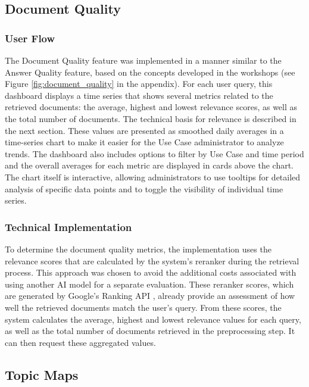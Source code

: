 \documentclass[
	english,
	ruledheaders=section,%
	class=report,%
	thesis={type=bachelor},%
	accentcolor=1b,%
	custommargins=true,%
	marginpar=false,%
	parskip=half-,%
	fontsize=11pt,%
	DIV=14,
]{tudapub}
\begin{document}
\subsection{Document Quality}
\subsubsection{User Flow}
The Document Quality feature was implemented in a manner similar to the Answer Quality feature, based on the concepts developed in the workshops (see Figure \ref{fig:document_quality} in the appendix). For each user query, this dashboard displays a time series that shows several metrics related to the retrieved documents: the average, highest and lowest relevance scores, as well as the total number of documents. The technical basis for relevance is described in the next section. These values are presented as smoothed daily averages in a time-series chart to make it easier for the Use Case administrator to analyze trends. The dashboard also includes options to filter by Use Case and time period and the overall averages for each metric are displayed in cards above the chart. The chart itself is interactive, allowing administrators to use tooltips for detailed analysis of specific data points and to toggle the visibility of individual time series.
\subsubsection{Technical Implementation}
To determine the document quality metrics, the implementation uses the relevance scores that are calculated by the system's reranker during the retrieval process. This approach was chosen to avoid the additional costs associated with using another AI model for a separate evaluation. These reranker scores, which are generated by Google's Ranking API \parencite{GoogleReranker}, already provide an assessment of how well the retrieved documents match the user's query. From these scores, the system calculates the average, highest and lowest relevance values for each query, as well as the total number of documents retrieved in the preprocessing step. It can then request these aggregated values.
\subsection{Topic Maps}
\end{document}
